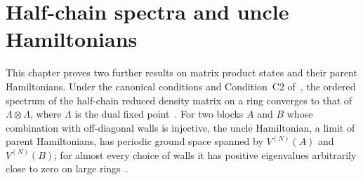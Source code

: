 \chapter{Half-chain spectra and uncle Hamiltonians}
\label{ch:parent_hamiltonian_half_chain_uncle}

This chapter proves two further results on matrix product states and their
parent Hamiltonians. Under the canonical conditions and Condition~C2
of~\cite{PerezGarcia2007Matrix}, the ordered spectrum of the half-chain reduced
density matrix on a ring converges to that of $\Lambda\otimes\Lambda$, where
$\Lambda$ is the dual fixed point~\cite[Theorem~6]{PerezGarcia2007Matrix}. For
two blocks $A$ and $B$ whose combination with off-diagonal walls is injective,
the uncle Hamiltonian, a limit of parent Hamiltonians, has periodic ground space
spanned by $V^{(N)}(A)$ and $V^{(N)}(B)$; for almost every choice of walls it
has positive eigenvalues arbitrarily close to zero on large
rings~\cite{FernandezGonzalez2015Uncle}.












